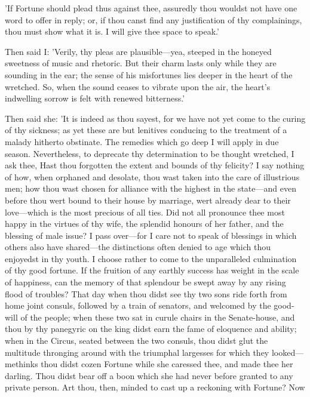 
'If Fortune should plead thus against thee, assuredly thou wouldst not
have one word to offer in reply; or, if thou canst find any
justification of thy complainings, thou must show what it is. I will
give thee space to speak.'

Then said I: 'Verily, thy pleas are plausible—yea, steeped in the
honeyed sweetness of music and rhetoric. But their charm lasts only
while they are sounding in the ear; the sense of his misfortunes lies
deeper in the heart of the wretched. So, when the sound ceases to
vibrate upon the air, the heart's indwelling sorrow is felt with renewed
bitterness.'

Then said she: 'It is indeed as thou sayest, for we have not yet come to
the curing of thy sickness; as yet these are but lenitives conducing to
the treatment of a malady hitherto obstinate. The remedies which go deep
I will apply in due season. Nevertheless, to deprecate thy
determination to be thought wretched, I ask thee, Hast thou forgotten
the extent and bounds of thy felicity? I say nothing of how, when
orphaned and desolate, thou wast taken into the care of illustrious men;
how thou wast chosen for alliance with the highest in the state—and
even before thou wert bound to their house by marriage, wert already
dear to their love—which is the most precious of all ties. Did not all
pronounce thee most happy in the virtues of thy wife, the splendid
honours of her father, and the blessing of male issue? I pass over—for
I care not to speak of blessings in which others also have shared—the
distinctions often denied to age which thou enjoyedst in thy youth. I
choose rather to come to the unparalleled culmination of thy good
fortune. If the fruition of any earthly success has weight in the scale
of happiness, can the memory of that splendour be swept away by any
rising flood of troubles? That day when thou didst see thy two sons ride
forth from home joint consuls, followed by a train of senators, and
welcomed by the good-will of the people; when these two sat in curule
chairs in the Senate-house, and thou by thy panegyric on the king didst
earn the fame of eloquence and ability; when in the Circus, seated
between the two consuls, thou didst glut the multitude thronging around
with the triumphal largesses for which they looked—methinks thou didst
cozen Fortune while she caressed thee, and made thee her darling. Thou
didst bear off a boon which she had never before granted to any private
person. Art thou, then, minded to cast up a reckoning with Fortune? Now
